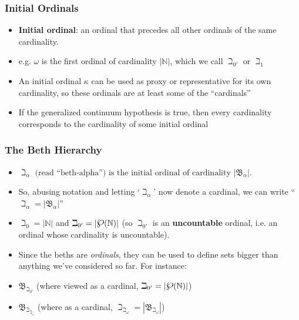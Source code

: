 \begin{frame}
\frametitle{Initial Ordinals}

\begin{itemize}[<+->]

\item \textbf{Initial ordinal}: an ordinal that precedes all other ordinals of the same cardinality.

\item e.g. $\omega$ is the first ordinal of cardinality $|\mathbb{N}|$, which we call $\beth_{0'}$ or $\beth_{1}$

\item An initial ordinal $\kappa$ can be used as proxy or representative for its own cardinality, so these ordinals are at least some of the ``cardinals''

\item If the generalized continuum hypothesis is true, then every cardinality corresponds to the cardinality of some initial ordinal 


\end{itemize}
\end{frame}

\begin{frame}
\frametitle{The Beth Hierarchy}

\begin{itemize}[<+->]

\item $\beth_\alpha \text{ (read ``beth-alpha'') is the initial ordinal of cardinality } |\mathfrak{B}_\alpha|$.

\item  So, abusing notation and letting `$\beth_\alpha$' now denote a cardinal, we can write ``$\beth_\alpha = |\mathfrak{B}_\alpha|$''

\item $\beth_0 = |\mathbb{N}|$ and $\beth_{0'} = |\powerset(\mathbb{N})|$ (so $\beth_{0'}$ is an \textbf{uncountable} ordinal, i.e. an ordinal whose cardinality is uncountable). 

\item Since the beths are \emph{ordinals}, they can be used to define sets bigger than anything we've considered so far. For instance: 

\item $\mathfrak{B}_{\beth_{0'}}$ (where viewed as a cardinal, $\beth_{0'} = |\powerset(\mathbb{N})|$)

\item $\mathfrak{B}_{\beth_{\beth_\omega}}$ (where as a cardinal, $\beth_{\beth_\omega} = |\mathfrak{B}_{\beth_{\omega}}|$)


\end{itemize}
\end{frame}



